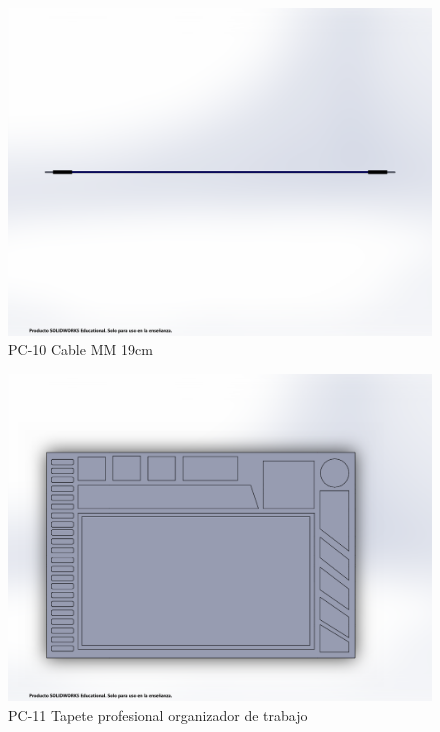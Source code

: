     \begin{figure}[H]
        \centering
        \includegraphics[trim = {1mm 50mm 1mm 50mm},clip,scale=0.2]{3/Img/cableMMFigura.pdf}
        \caption{PC-10 Cable MM 19cm}
        \label{fig:cableMMFigura}
    \end{figure}
    \begin{figure}[H]
        \centering
        \includegraphics[trim = {1mm 10mm 30mm 30mm},clip,scale=0.2]{3/Img/tapeteProfesionalOrganizadorDeTrabajoFigura.pdf}
        \caption{PC-11 Tapete profesional organizador de trabajo}
        \label{fig:tapeteProfesionalOrganizadorDeTrabajoFigura}
    \end{figure}
